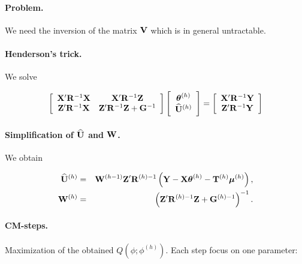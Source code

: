 \documentclass[17pt,landscape]{foils}
\newcommand{\mubf}{\mbox{\mathversion{bold}{$\mu$}}}
\newcommand{\thetabf}{\mbox{\mathversion{bold}{$\theta$}}}
\newcommand{\Gbf}{{\bf G}}
\newcommand{\Rbf}{{\bf R}}
\newcommand{\Tbf}{{\bf T}}
\newcommand{\Ubf}{{\bf U}}
\newcommand{\Vbf}{{\bf V}}
\newcommand{\Xbf}{{\bf X}}
\newcommand{\Wbf}{{\bf W}}
\newcommand{\Ybf}{{\bf Y}}
\newcommand{\Zbf}{{\bf Z}}
\begin{document}
\newpage
{} \foilhead[-.5in]{}


\paragraph{Problem.} We need the inversion of the matrix $\Vbf$ which
is in general untractable.


\paragraph{Henderson's trick.} We solve

$$
\left[
\begin{array}{cc}
\Xbf ' \Rbf^{-1} \Xbf     &  \Xbf' \Rbf^{-1} \Zbf  \\
\Zbf' \Rbf^{-1} \Xbf   & \Zbf' \Rbf^{-1} \Zbf +\Gbf^{-1}      \\
\end{array}
\right] \left[
\begin{array}{c} \thetabf^{(h)} \\ \widehat{\Ubf}^{(h)}
\end{array}
\right] = \left[
\begin{array}{c}
\Xbf' \Rbf^{-1} \Ybf \\ \Zbf' \Rbf^{-1} \Ybf
\end{array}
\right]
$$


\paragraph{Simplification of $\widehat{\Ubf}$ and $\Wbf$.} We obtain


\begin{eqnarray*}
  \widehat{\Ubf}^{(h)} & = &  \Wbf^{(h-1)} \Zbf^{\prime} \Rbf^{(h)-1}
  \left(\Ybf-\Xbf \thetabf^{(h)}-\Tbf^{(h)}  \mubf^{(h)}\right), \\
  \Wbf^{(h)} & = &\left(\Zbf^{\prime} \Rbf^{(h)-1} \Zbf +
  \Gbf^{(h)-1} \right)^{-1}.
\end{eqnarray*}




\newpage
{} \foilhead[-.5in]{}




\paragraph{CM-steps.} Maximization of the obtained $Q(\phi; \phi^{(h)})$. Each step focus on one parameter:
\end{document}
